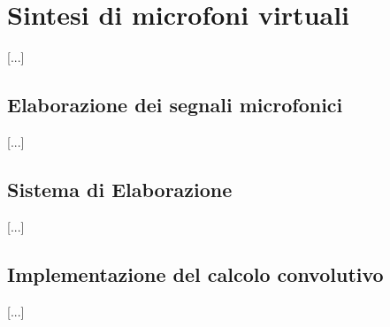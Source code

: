 \chapter{Sintesi di microfoni virtuali}
\label{sec:virtualmikes}
[...]\\


\section{Elaborazione dei segnali microfonici}
\label{sec:}
	
	[...]\\

\section{Sistema di Elaborazione}
\label{sec:sistelab}
	
	[...]\\
	
	
\section{Implementazione del calcolo convolutivo}
\label{sec:}
	[...]\\
	
